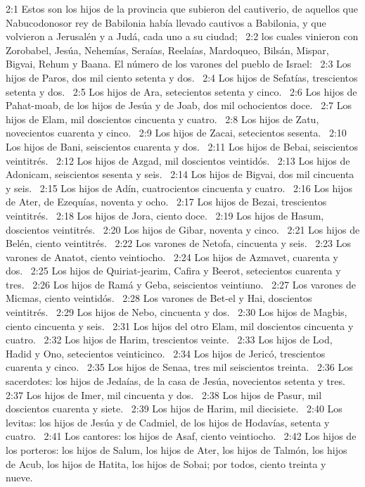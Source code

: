 2:1 Estos son los hijos de la provincia que subieron del cautiverio, de aquellos que Nabucodonosor rey de Babilonia había llevado cautivos a Babilonia, y que volvieron a Jerusalén y a Judá, cada uno a su ciudad;  
2:2 los cuales vinieron con Zorobabel, Jesúa, Nehemías, Seraías, Reelaías, Mardoqueo, Bilsán, Mispar, Bigvai, Rehum y Baana. El número de los varones del pueblo de Israel:  
2:3 Los hijos de Paros, dos mil ciento setenta y dos.  
2:4 Los hijos de Sefatías, trescientos setenta y dos.  
2:5 Los hijos de Ara, setecientos setenta y cinco.  
2:6 Los hijos de Pahat-moab, de los hijos de Jesúa y de Joab, dos mil ochocientos doce.  
2:7 Los hijos de Elam, mil doscientos cincuenta y cuatro.  
2:8 Los hijos de Zatu, novecientos cuarenta y cinco.  
2:9 Los hijos de Zacai, setecientos sesenta.  
2:10 Los hijos de Bani, seiscientos cuarenta y dos.  
2:11 Los hijos de Bebai, seiscientos veintitrés.  
2:12 Los hijos de Azgad, mil doscientos veintidós.  
2:13 Los hijos de Adonicam, seiscientos sesenta y seis.  
2:14 Los hijos de Bigvai, dos mil cincuenta y seis.  
2:15 Los hijos de Adín, cuatrocientos cincuenta y cuatro.  
2:16 Los hijos de Ater, de Ezequías, noventa y ocho.  
2:17 Los hijos de Bezai, trescientos veintitrés.  
2:18 Los hijos de Jora, ciento doce.  
2:19 Los hijos de Hasum, doscientos veintitrés.  
2:20 Los hijos de Gibar, noventa y cinco.  
2:21 Los hijos de Belén, ciento veintitrés.  
2:22 Los varones de Netofa, cincuenta y seis.  
2:23 Los varones de Anatot, ciento veintiocho.  
2:24 Los hijos de Azmavet, cuarenta y dos.  
2:25 Los hijos de Quiriat-jearim, Cafira y Beerot, setecientos cuarenta y tres.  
2:26 Los hijos de Ramá y Geba, seiscientos veintiuno.  
2:27 Los varones de Micmas, ciento veintidós.  
2:28 Los varones de Bet-el y Hai, doscientos veintitrés.  
2:29 Los hijos de Nebo, cincuenta y dos.  
2:30 Los hijos de Magbis, ciento cincuenta y seis.  
2:31 Los hijos del otro Elam, mil doscientos cincuenta y cuatro.  
2:32 Los hijos de Harim, trescientos veinte.  
2:33 Los hijos de Lod, Hadid y Ono, setecientos veinticinco.  
2:34 Los hijos de Jericó, trescientos cuarenta y cinco.  
2:35 Los hijos de Senaa, tres mil seiscientos treinta.  
2:36 Los sacerdotes: los hijos de Jedaías, de la casa de Jesúa, novecientos setenta y tres.  
2:37 Los hijos de Imer, mil cincuenta y dos.  
2:38 Los hijos de Pasur, mil doscientos cuarenta y siete.  
2:39 Los hijos de Harim, mil diecisiete.  
2:40 Los levitas: los hijos de Jesúa y de Cadmiel, de los hijos de Hodavías, setenta y cuatro.  
2:41 Los cantores: los hijos de Asaf, ciento veintiocho.  
2:42 Los hijos de los porteros: los hijos de Salum, los hijos de Ater, los hijos de Talmón, los hijos de Acub, los hijos de Hatita, los hijos de Sobai; por todos, ciento treinta y nueve.  
